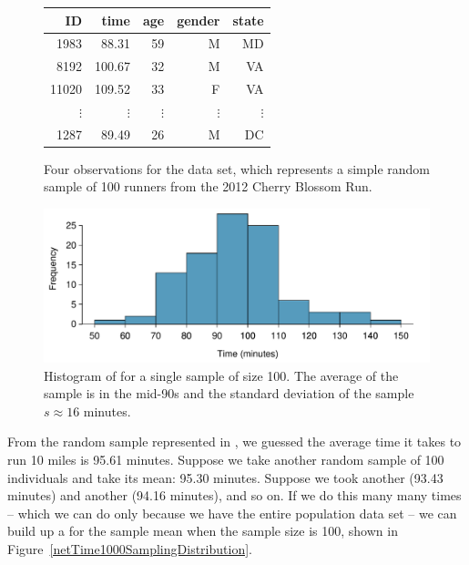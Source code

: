 \begin{figure}
\centering
\begin{tabular}{rrrrr}
  \hline
ID & time & age & gender & state \\ 
  \hline
1983 & 88.31 & 59 & M & MD \\ 
8192 & 100.67 & 32 & M & VA \\ 
11020 & 109.52 & 33 & F & VA \\ 
  $\vdots$ &   $\vdots$ &   $\vdots$ &   $\vdots$ &   $\vdots$ \\ 
1287 & 89.49 & 26 & M & DC \\ 
   \hline
\end{tabular}
\caption{Four observations for the  data set, which represents a simple random sample of 100 runners from the 2012 Cherry Blossom Run.}
\label{run10SampDF}
\end{figure}


\begin{figure}
\centering
\includegraphics[width=\textwidth]{ch_distributions/figures/run10SampHistograms/run10SampHistograms} 
\caption{Histogram of  for a single sample of size 100. The average of the sample is in the mid-90s and the standard deviation of the sample $s\approx 16$ minutes.
}
\label{run10SampHistograms}
\end{figure}

From the random sample represented in , we guessed the average time it takes to run 10 miles is 95.61 minutes. Suppose we take another random sample of 100 individuals and take its mean: 95.30 minutes. Suppose we took another (93.43 minutes) and another (94.16 minutes), and so on. If we do this many many times -- which we can do only because we have the entire population data set -- we can build up a  for the sample mean when the sample size is 100, shown in Figure~\ref{netTime1000SamplingDistribution}.

